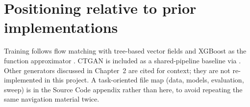 \section{Positioning relative to prior implementations}
\label{sec:external-methods}

Training follows flow matching \cite{lipman2023flow} with tree-based vector fields \cite{jolicoeur2023forest,akazan2024hs3f} and XGBoost as the function approximator \cite{chen2016xgboost}. CTGAN \cite{xu2019ctgan} is included as a shared-pipeline baseline via . Other generators discussed in Chapter~2 are cited for context; they are not re-implemented in this project. A task-oriented file map (data, models, evaluation, sweep) is in the Source Code appendix rather than here, to avoid repeating the same navigation material twice.

